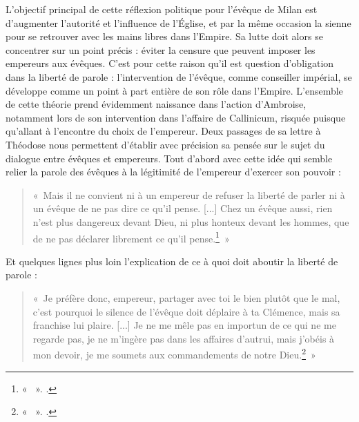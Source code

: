 \bigskip

L'objectif principal de cette réflexion politique pour l'évêque de Milan est d'augmenter l'autorité et l'influence de l'Église, et par la même occasion la sienne pour se retrouver avec les mains libres dans l'Empire. Sa lutte doit alors se concentrer sur un point précis : éviter la censure que peuvent imposer les empereurs aux évêques. C'est pour cette raison qu'il est question d'obligation dans la liberté de parole : l'intervention de l'évêque, comme conseiller impérial, se développe comme un point à part entière de son rôle dans l'Empire. L'ensemble de cette théorie prend évidemment naissance dans l'action d'Ambroise, notamment lors de son intervention dans l'affaire de Callinicum, risquée puisque qu'allant à l'encontre du choix de l'empereur. Deux passages de sa lettre à Théodose nous permettent d'établir avec précision sa pensée sur le sujet du dialogue entre évêques et empereurs. Tout d'abord avec cette idée qui semble relier la parole des évêques à la légitimité de l'empereur d'exercer son pouvoir :

\bigskip

\begin{quote}
    «~Mais il ne convient ni à un empereur de refuser la liberté de parler ni à un évêque de ne pas dire ce qu’il pense. [...] Chez un évêque aussi, rien n’est plus dangereux devant Dieu, ni plus honteux devant les hommes, que de ne pas déclarer librement ce qu’il pense.\footnote{« ~». \cite[,2]{ambroise_lettres}.}~»
\end{quote}

\bigskip

Et quelques lignes plus loin l'explication de ce à quoi doit aboutir la liberté de parole :

\bigskip

\begin{quote}
    «~Je préfère donc, empereur, partager avec toi le bien plutôt que le mal, c’est pourquoi le silence de l’évêque doit déplaire à ta Clémence, mais sa franchise lui plaire. [...] Je ne me mêle pas en importun de ce qui ne me regarde pas, je ne m’ingère pas dans les affaires d’autrui, mais j’obéis à mon devoir, je me soumets aux commandements de notre Dieu.\footnote{« ~». \cite[,3]{ambroise_lettres}.}~»
\end{quote}

